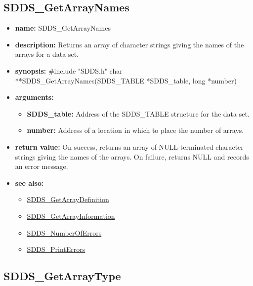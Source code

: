 \documentclass[11pt]{article}
\newcommand{\progref}[1]{\hyperref{SDDS_#1}{{\tt SDDS\_#1} (}{)}{SDDS_#1}}
\begin{document}
\subsection{SDDS\_GetArrayNames}
\label{SDDS_GetArrayNames}

\begin{itemize}
\item {\bf name:}\newline
SDDS\_GetArrayNames
\item {\bf description:}\newline
Returns an array of character strings giving the names of the arrays for a data set.
\item {\bf synopsis:} \#include "SDDS.h"\newline
char **SDDS\_GetArrayNames(SDDS\_TABLE *SDDS\_table, long *number)
\item {\bf arguments:}
\begin{itemize}
\item {\bf SDDS\_table:} Address of the SDDS\_TABLE structure for the data set.
\item {\bf number:} Address of a location in which to place the number of arrays.
\end{itemize}
\item {\bf return value:}\newline
On success, returns an array of NULL-terminated character strings giving the names of the arrays. On failure, returns NULL and records an error message.
\item {\bf see also:}
\begin{itemize}
\item \progref{GetArrayDefinition}
\item \progref{GetArrayInformation}
\item \progref{NumberOfErrors}
\item \progref{PrintErrors}
\end{itemize}
\end{itemize}

\subsection{SDDS\_GetArrayType}
\label{SDDS_GetArrayType}
\end{document}
